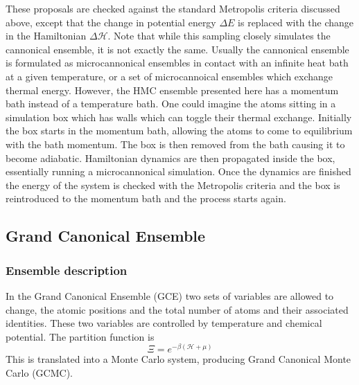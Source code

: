 These proposals are checked against the standard Metropolis criteria discussed above, except that the change in potential energy $\Delta E$ is replaced with the change in the Hamiltonian $\Delta \mathcal{H}$.
Note that while this sampling closely simulates the cannonical ensemble, it is not exactly the same.
Usually the cannonical ensemble is formulated as microcannonical ensembles in contact with an infinite heat bath at a given temperature, or a set of microcannoical ensembles which exchange thermal energy.
However, the HMC ensemble presented here has a momentum bath instead of a temperature bath.
One could imagine the atoms sitting in a simulation box which has walls which can toggle their thermal exchange.
Initially the box starts in the momentum bath, allowing the atoms to come to equilibrium with the bath momentum.
The box is then removed from the bath causing it to become adiabatic.
Hamiltonian dynamics are then propagated inside the box, essentially running a microcannonical simulation.
Once the dynamics are finished the energy of the system is checked with the Metropolis criteria and the box is reintroduced to the momentum bath and the process starts again.


\subsection{Grand Canonical Ensemble}

\subsubsection{Ensemble description}
In the Grand Canonical Ensemble (GCE) two sets of variables are allowed to change, the atomic positions and the total number of atoms and their associated identities.  
These two variables are controlled by temperature and chemical potential.  
The partition function is
\begin{equation}
  \Xi = e^{-\beta(\mathcal{H} +\mu)}
\end{equation}
This is translated into a Monte Carlo system, producing Grand Canonical Monte Carlo (GCMC).
